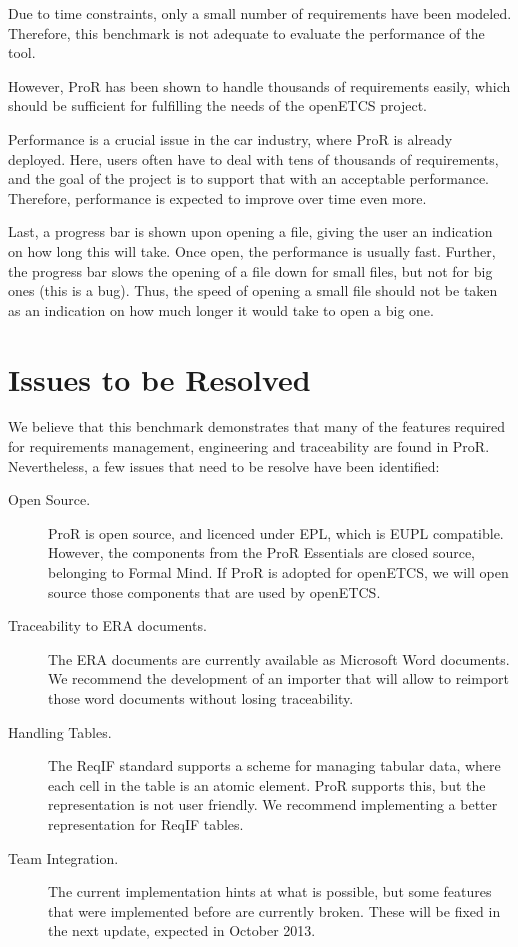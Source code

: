 \documentclass{template/openetcs_report}
\begin{document}
Due to time constraints, only a small number of requirements have been modeled.  Therefore, this benchmark is not adequate to evaluate the performance of the tool.

However, ProR has been shown to handle thousands of requirements easily, which should be sufficient for fulfilling the needs of the openETCS project.

Performance is a crucial issue in the car industry, where ProR is already deployed.  Here, users often have to deal with tens of thousands of requirements, and the goal of the project is to support that with an acceptable performance.  Therefore, performance is expected to improve over time even more.

Last, a progress bar is shown upon opening a file, giving the user an indication on how long this will take.  Once open, the performance is usually fast.  Further, the progress bar slows the opening of a file down for small files, but not for big ones (this is a bug).  Thus, the speed of opening a small file should not be taken as an indication on how much longer it would take to open a big one.

\section{Issues to be Resolved}

We believe that this benchmark demonstrates that many of the features required for requirements management, engineering and traceability are found in ProR.  Nevertheless, a few issues that need to be resolve have been identified:

\begin{description}

\item[Open Source.] ProR is open source, and licenced under EPL, which is EUPL compatible.  However, the components from the ProR Essentials are closed source, belonging to Formal Mind.  If ProR is adopted for openETCS, we will open source those components that are used by openETCS.

\item[Traceability to ERA documents.]  The ERA documents are currently available as Microsoft Word documents.  We recommend the development of an importer that will allow to reimport those word documents without losing traceability.

\item[Handling Tables.]  The ReqIF standard supports a scheme for managing tabular data, where each cell in the table is an atomic element.  ProR supports this, but the representation is not user friendly.  We recommend implementing a better representation for ReqIF tables.

\item[Team Integration.]  The current implementation hints at what is possible, but some features that were implemented before are currently broken.  These will be fixed in the next update, expected in October 2013.

\end{description}
\end{document}
